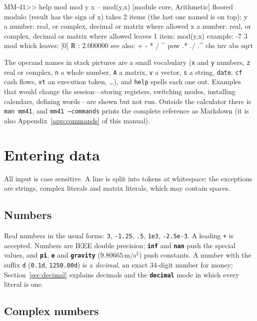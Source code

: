 \documentclass[11pt,letterpaper]{article}
\newcommand{\code}[1]{\texttt{#1}}
\newcommand{\cmd}[1]{\texttt{\textbf{#1}}}
\begin{document}
\begin{rpn}
MM-41>> help mod
mod   y x -- mod(y,x)   [module core, Arithmetic]
    floored modulo (result has the sign of x)
    takes 2 items (the last one named is on top):
      y          a number: real, or complex, decimal or matrix where allowed
      x          a number: real, or complex, decimal or matrix where allowed
    leaves 1 item:
      mod(y,x)
    example:  -7 3 mod
    which leaves:
[0] ℝ : 2.000000
    see also: + - * / ^ pow .* ./ .^ chs inv abs
              sqrt %
\end{rpn}
The operand names in stack pictures are a small vocabulary (\code{x} and \code{y} numbers, \code{z} real or complex, \code{n} a whole number, \code{A} a matrix, \code{v} a vector, \code{s} a string, \code{date}, \code{cf} cash flows, \code{xt} an execution token, \ldots), and \code{help} spells each one out. Examples that would change the session---storing registers, switching modes, installing calendars, defining words---are shown but not run. Outside the calculator there is \code{man mm41}, and \code{mm41 --commands} prints the complete reference as Markdown (it is also Appendix~\ref{app:commands} of this manual).

\section{Entering data}

All input is case sensitive. A line is split into tokens at whitespace; the exceptions are strings, complex literals and matrix literals, which may contain spaces.

\subsection{Numbers}

Real numbers in the usual forms: \code{3}, \code{-1.25}, \code{.5}, \code{1e3}, \code{-2.5e-3}. A leading \code{+} is accepted. Numbers are IEEE double precision; \cmd{inf} and \cmd{nan} push the special values, and \cmd{pi}, \cmd{e} and \cmd{gravity} ($9.80665\,\mathrm{m/s^2}$) push constants. A number with the suffix \code{d} (\code{0.1d}, \code{1250.00d}) is a \emph{decimal}, an exact 34-digit number for money; Section~\ref{sec:decimal} explains decimals and the \cmd{decimal} mode in which every literal is one.

\subsection{Complex numbers}
\end{document}
